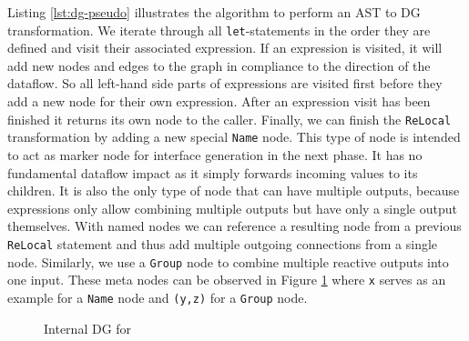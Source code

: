 Listing \ref{lst:dg-pseudo} illustrates the algorithm to perform an \ac{AST} to \ac{DG} transformation. We iterate through all \lstinline{let}-statements in the order they are defined and visit their associated expression. If an expression is visited, it will add new nodes and edges to the graph in compliance to the direction of the dataflow. So all left-hand side parts of expressions are visited first before they add a new node for their own expression. After an expression visit has been finished it returns its own node to the caller. Finally, we can finish the \lstinline{ReLocal} transformation by adding a new special \lstinline{Name} node. This type of node is intended to act as marker node for interface generation in the next phase. It has no fundamental dataflow impact as it simply forwards incoming values to its children. It is also the only type of node that can have multiple outputs, because expressions only allow combining multiple outputs but have only a single output themselves. With named nodes we can reference a resulting node from a previous \lstinline{ReLocal} statement and thus add multiple outgoing connections from a single node. Similarly, we use a \lstinline{Group} node to combine multiple reactive outputs into one input. These meta nodes can be observed in Figure \ref{fig:diamond-dg-internal} where \lstinline{x} serves as an example for a \lstinline{Name} node and \lstinline{(y,z)} for a \lstinline{Group} node.

\begin{figure}[htbp]
    \centering
    \caption{Internal DG for \rerust}
    \label{fig:diamond-dg-internal}
\end{figure}

